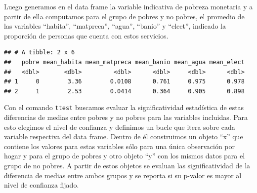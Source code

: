 \documentclass[
]{book}
\newenvironment{Shaded}{\begin{snugshade}}{\end{snugshade}}
\newcommand{\AttributeTok}[1]{\textcolor[rgb]{0.77,0.63,0.00}{#1}}
\newcommand{\ConstantTok}[1]{\textcolor[rgb]{0.00,0.00,0.00}{#1}}
\newcommand{\DecValTok}[1]{\textcolor[rgb]{0.00,0.00,0.81}{#1}}
\newcommand{\FloatTok}[1]{\textcolor[rgb]{0.00,0.00,0.81}{#1}}
\newcommand{\FunctionTok}[1]{\textcolor[rgb]{0.00,0.00,0.00}{#1}}
\newcommand{\NormalTok}[1]{#1}
\newcommand{\OtherTok}[1]{\textcolor[rgb]{0.56,0.35,0.01}{#1}}
\newcommand{\SpecialCharTok}[1]{\textcolor[rgb]{0.00,0.00,0.00}{#1}}
\begin{document}
Luego generamos en el data frame la variable indicativa de pobreza monetaria y a partir de ella computamos para el grupo de pobres y no pobres, el promedio de las variables ``habita'', ``matpreca'', ``agua'', ``banio'' y ``elect'', indicado la proporción de personas que cuenta con estos servicios.

\begin{Shaded}
\end{Shaded}

\begin{verbatim}
## # A tibble: 2 x 6
##   pobre mean_habita mean_matpreca mean_banio mean_agua mean_elect
##   <dbl>       <dbl>         <dbl>      <dbl>     <dbl>      <dbl>
## 1     0        3.36        0.0108      0.761     0.975      0.978
## 2     1        2.53        0.0414      0.364     0.905      0.898
\end{verbatim}

Con el comando \texttt{ttest} buscamos evaluar la significatividad estadística de estas diferencias de medias entre pobres y no pobres para las variables incluidas. Para esto elegimos el nivel de confianza y definimos un bucle que itera sobre cada variable respectiva del data frame. Dentro de él construimos un objeto ``x'' que contiene los valores para estas variables sólo para una única observación por hogar y para el grupo de pobres y otro objeto ``y'' con los mismos datos para el grupo de no pobres. A partir de estos objetos se evaluan las significatividad de la diferencia de medias entre ambos grupos y se reporta si su p-valor es mayor al nivel de confianza fijado.
\end{document}
